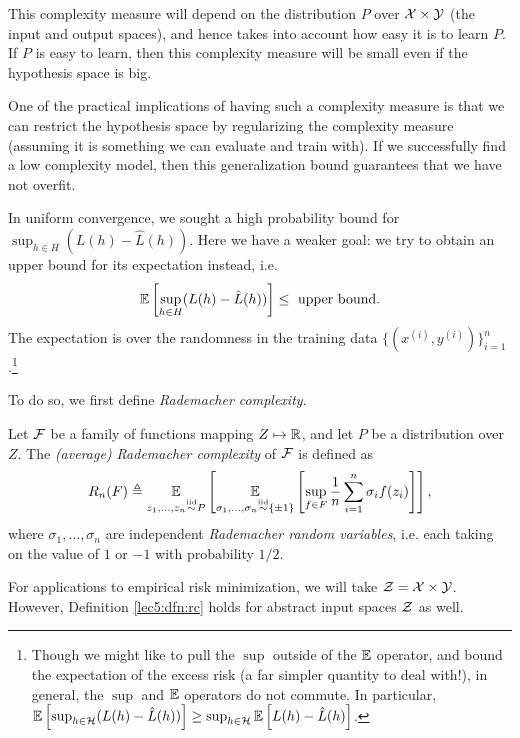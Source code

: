 This complexity measure will depend on the distribution $P$ over $\mathcal X \times \mathcal Y$ (the input and output spaces), and hence takes into account how easy it is to learn $P$. If $P$ is easy to learn, then this complexity measure will be small even if the hypothesis space is big.

One of the practical implications of having such a complexity measure is that we can restrict the hypothesis space by regularizing the complexity measure (assuming it is something we can evaluate and train with). If we successfully find a low complexity model, then this generalization bound guarantees that we have not overfit.


In uniform convergence, we sought a high probability bound for $\sup_{h \in H}(L(h) - \hat L (h))$. Here we have a weaker goal: we try to obtain an upper bound for its expectation instead, i.e.
\begin{equation}
\operatorname*{\mathbb{E}}\left[ \sup_{h \in H}(L(h) - \hat L (h)) \right] \leq \text{ upper bound}. \label{lec5:eq:generror}
\end{equation}
The expectation is over the randomness in the training data $\{(x^{(i)}, y^{(i)})\}_{i=1}^n$.\footnote{Though we might like to pull the $\sup$ outside of the $\operatorname*{\mathbb{E}}$ operator, and bound the expectation of the excess risk (a far simpler quantity to deal with!), in general, the $\sup$ and $\operatorname*{\mathbb{E}}$ operators do not commute. In particular, $\operatorname*{\mathbb{E}}\left [\sup_{h \in \mathcal H} (L(h) - \hat{L}(h)) \right ] \geq \sup_{h \in \mathcal H} \operatorname*{\mathbb{E}} \left[ L(h) - \hat{L} (h) \right]$.}

To do so, we first define \textit{Rademacher complexity}.

\begin{definition} \label{lec5:dfn:rc}
Let $\mathcal F$ be a family of functions mapping $Z \mapsto \mathbb R$, and let $P$ be a distribution over $Z$. The \textit{(average) Rademacher complexity} of $\mathcal F$ is defined as 
\begin{align}
    R_n(F) \triangleq \operatorname*{\mathbb{E}}_{z_1, \dots, z_n \overset{\textup{iid}}{\sim} P} \left[ 
    \operatorname*{\mathbb{E}}_{\sigma_1, \dots, \sigma_n \overset{\textup{iid}}{\sim}\{ \pm 1 \}} \left[ \sup_{f\in F} \frac{1}{n} \sum^n_{i=1} \sigma_i f(z_i) \right] \right], \label{lec5:eqn:Rn}
\end{align}
where $\sigma_1, \dots, \sigma_n$ are independent \textit{Rademacher random variables}, i.e. each taking on the value of $1$ or $-1$ with probability $1/2$.
\end{definition}

\begin{remark}
For applications to empirical risk minimization, we will take $\mathcal Z = \mathcal X \times \mathcal Y$. However, Definition \ref{lec5:dfn:rc} holds for abstract input spaces $\mathcal Z$ as well.
\end{remark}

